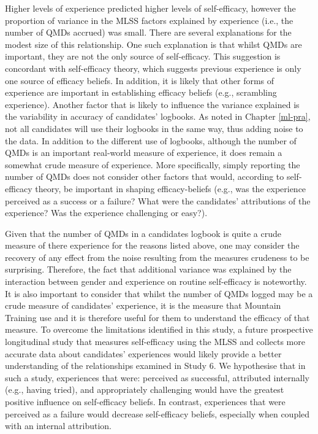 \documentclass[
  12pt,
  a4paper,
]{book}
\begin{document}
Higher levels of experience predicted higher levels of self-efficacy, however the proportion of variance in the MLSS factors explained by experience (i.e., the number of QMDs accrued) was small. There are several explanations for the modest size of this relationship. One such explanation is that whilst QMDs are important, they are not the only source of self-efficacy. This suggestion is concordant with self-efficacy theory, which suggests previous experience is only one source of efficacy beliefs. In addition, it is likely that other forms of experience are important in establishing efficacy beliefs (e.g., scrambling experience). Another factor that is likely to influence the variance explained is the variability in accuracy of candidates' logbooks. As noted in Chapter \ref{ml-pra}, not all candidates will use their logbooks in the same way, thus adding noise to the data. In addition to the different use of logbooks, although the number of QMDs is an important real-world measure of experience, it does remain a somewhat crude measure of experience. More specifically, simply reporting the number of QMDs does not consider other factors that would, according to self-efficacy theory, be important in shaping efficacy-beliefs (e.g., was the experience perceived as a success or a failure? What were the candidates' attributions of the experience? Was the experience challenging or easy?).

Given that the number of QMDs in a candidates logbook is quite a crude measure of there experience for the reasons listed above, one may consider the recovery of any effect from the noise resulting from the measures crudeness to be surprising. Therefore, the fact that additional variance was explained by the interaction between gender and experience on routine self-efficacy is noteworthy. It is also important to consider that whilst the number of QMDs logged may be a crude measure of candidates' experience, it is the measure that Mountain Training use and it is therefore useful for them to understand the efficacy of that measure. To overcome the limitations identified in this study, a future prospective longitudinal study that measures self-efficacy using the MLSS and collects more accurate data about candidates' experiences would likely provide a better understanding of the relationships examined in Study 6. We hypothesise that in such a study, experiences that were: perceived as successful, attributed internally (e.g., having tried), and appropriately challenging would have the greatest positive influence on self-efficacy beliefs. In contrast, experiences that were perceived as a failure would decrease self-efficacy beliefs, especially when coupled with an internal attribution.
\end{document}
